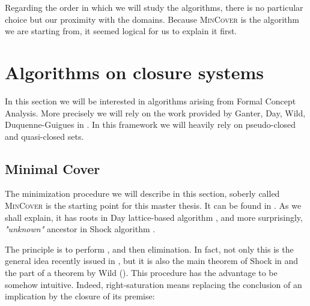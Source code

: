 \vspace{1.2em}

Regarding the order in which we will study the algorithms, there is no particular choice but our proximity with the domains. Because \textsc{MinCover} 
is the algorithm we are starting from, it seemed logical for us to explain
it first. 





\section{Algorithms on closure systems}

In this section we will be interested in algorithms arising from Formal Concept
Analysis. More precisely we will rely on the work provided by Ganter, Day, Wild,
Duquenne-Guigues in \cite{ganter_formal_1999, ganter_two_2010, day_lattice_1992, wild_implicational_1989, wild_computations_1995, guigues_j.l_familles_1986, duquenne_variations_2007}. In this framework we will heavily rely on pseudo-closed and quasi-closed sets.



\subsection{Minimal Cover}

The minimization procedure we will describe in this section, soberly called
\textsc{MinCover} is the starting point for this master thesis. It can be found
in \cite{b._ganter_conceptual_2016}. As we shall explain, it has roots in
Day lattice-based algorithm \cite{day_lattice_1992}, and more surprisingly, 
\textit{"unknown"} ancestor in Shock algorithm \cite{shock_computing_1986}. 

\vspace{1.2em}

The principle is to perform , and then  elimination. In fact, not only this is the general idea recently 
issued in \cite{boros_strong_2017}, but it is also the main theorem of Shock in 
\cite{shock_computing_1986} and the part of a theorem by Wild 
(\cite{wild_implicational_1989, wild_theory_1994}). This procedure has the 
advantage to be somehow intuitive. Indeed, right-saturation means replacing the 
conclusion of an implication by the closure of its premise:

